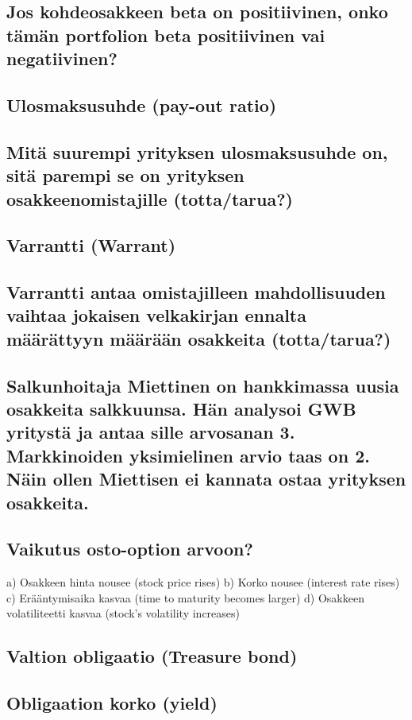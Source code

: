 \documentclass[a4paper]{article}
\begin{document}
\subsection{Jos kohdeosakkeen beta on positiivinen, onko tämän portfolion beta positiivinen vai negatiivinen?}

\subsection{Ulosmaksusuhde (pay-out ratio)}

\subsection{Mitä suurempi yrityksen ulosmaksusuhde on, sitä parempi se on yrityksen osakkeenomistajille (totta/tarua?)}

\subsection{Varrantti (Warrant)}

\subsection{Varrantti antaa omistajilleen mahdollisuuden vaihtaa jokaisen velkakirjan ennalta määrättyyn määrään osakkeita (totta/tarua?)}

\subsection{Salkunhoitaja Miettinen on hankkimassa uusia osakkeita salkkuunsa. Hän analysoi GWB yritystä ja antaa sille arvosanan 3. Markkinoiden yksimielinen arvio taas on 2. Näin ollen Miettisen ei kannata ostaa yrityksen osakkeita.}

\subsection{Vaikutus osto-option arvoon?}
a) Osakkeen hinta nousee (stock price rises)
b) Korko nousee (interest rate rises)
c) Erääntymisaika kasvaa (time to maturity becomes larger)
d) Osakkeen volatiliteetti kasvaa (stock's volatility increases)

\subsection{Valtion obligaatio (Treasure bond)}

\subsection{Obligaation korko (yield)}
\end{document}
